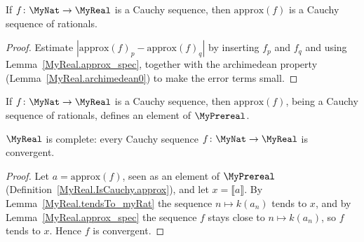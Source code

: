 \begin{lemma}
    \label{MyReal.approx_cauchy}
    \leanok
    If $f \colon \MyNat \to \MyReal$ is a Cauchy sequence, then $\mathrm{approx}(f)$ is a Cauchy
    sequence of rationals.
\end{lemma}
\begin{proof}
    \leanok
    Estimate $|\mathrm{approx}(f)_p - \mathrm{approx}(f)_q|$ by inserting $f_p$ and $f_q$ and using
    Lemma~\ref{MyReal.approx_spec}, together with the archimedean property
    (Lemma~\ref{MyReal.archimedean0}) to make the error terms small.
\end{proof}

\begin{definition}
    \label{MyReal.IsCauchy.approx}
    \leanok
    If $f \colon \MyNat \to \MyReal$ is a Cauchy sequence, then $\mathrm{approx}(f)$, being a Cauchy
    sequence of rationals, defines an element of $\MyPrereal$.
\end{definition}

\begin{theorem}
    \label{MyReal.complete}
    \leanok
    $\MyReal$ is complete: every Cauchy sequence $f \colon \MyNat \to \MyReal$ is convergent.
\end{theorem}
\begin{proof}
    \leanok
    Let $a = \mathrm{approx}(f)$, seen as an element of $\MyPrereal$
    (Definition~\ref{MyReal.IsCauchy.approx}), and let $x = ⟦ a ⟧$. By
    Lemma~\ref{MyReal.tendsTo_myRat} the sequence $n \mapsto k(a_n)$ tends to $x$, and by
    Lemma~\ref{MyReal.approx_spec} the sequence $f$ stays close to $n \mapsto k(a_n)$, so $f$ tends
    to $x$. Hence $f$ is convergent.
\end{proof}
